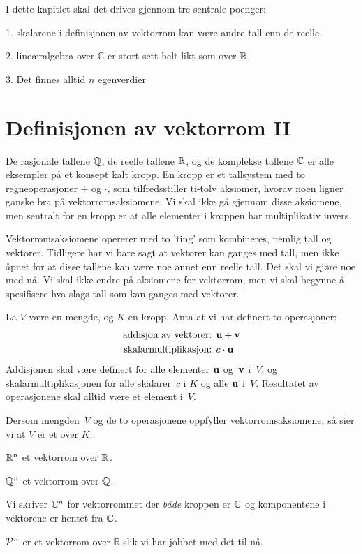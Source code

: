 

\label{ch:kompleks-linear-algebra}

I dette kapitlet skal det drives gjennom tre sentrale poenger: 

1. skalarene i definisjonen av vektorrom kan være andre tall enn de reelle.

2. lineæralgebra over $\mathbb C$ er stort sett helt likt som over $\R$.

3. Det finnes alltid $n$ egenverdier


\section*{Definisjonen av vektorrom II}

De rasjonale tallene $\Q$, de reelle tallene $\R$, og de komplekse tallene $\C$ er alle eksempler på et konsept kalt kropp. En kropp er et tallsystem med to regneoperasjoner $+$ og $\cdot$, som tilfredsstiller ti-tolv aksiomer, hvorav noen ligner ganske bra på vektorromsaksiomene. Vi skal ikke gå gjennom disse aksiomene, men sentralt for en kropp er at alle elementer i kroppen har multiplikativ invers.

Vektorromsaksiomene opererer med to 'ting' som kombineres, nemlig tall og vektorer. Tidligere har vi bare sagt at vektorer kan ganges med tall, men ikke åpnet for at disse tallene kan være noe annet enn reelle tall. Det skal vi gjøre noe med nå. Vi skal ikke endre på aksiomene for vektorrom, men vi skal begynne å spesifisere hva slags tall som kan ganges med vektorer. 

\begin{defn}
La $V$ være en mengde, og $K$ en kropp. Anta at vi har definert to operasjoner:
\begin{align*}
\text{addisjon av vektorer: } & \V{u} + \V{v} \\
\text{skalarmultiplikasjon: } & c \cdot \V{u}
\end{align*}
Addisjonen skal være definert for alle elementer $\V{u}$ og~$\V{v}$
i~$V$, og skalarmultiplikasjonen for alle skalarer~$c$ i $K$ og alle $\V{u}$
i~$V$.  Resultatet av operasjonene skal alltid være et element i~$V$.

Dersom mengden~$V$ og de to operasjonene oppfyller vektorromsaksiomene, 
så sier vi at $V$ er et  over $K$.
\end{defn}

\begin{ex}
$\R^n$ et vektorrom over $\R$.
\end{ex}
\begin{ex}
$\Q^n$ et vektorrom over $\Q$.
\end{ex}
\begin{ex}
Vi skriver $\C^n$ for vektorrommet der \emph{både} kroppen er $\C$ og komponentene i vektorene er hentet fra $\C$.
\end{ex}
\begin{ex}
$\P^n$ er et vektorrom over $\mathbb R$ slik vi har jobbet med det til nå.
\end{ex}

